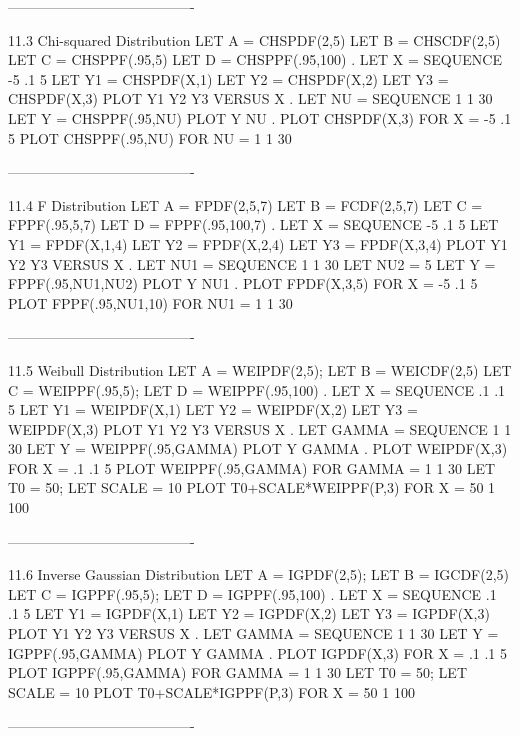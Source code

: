 ----------------------------------------
 
11.3
Chi-squared Distribution
      LET A = CHSPDF(2,5)
      LET B = CHSCDF(2,5)
      LET C = CHSPPF(.95,5)
      LET D = CHSPPF(.95,100)
      .
      LET X = SEQUENCE -5 .1 5
      LET Y1 = CHSPDF(X,1)
      LET Y2 = CHSPDF(X,2)
      LET Y3 = CHSPDF(X,3)
      PLOT Y1 Y2 Y3 VERSUS X
      .
      LET NU = SEQUENCE 1 1 30
      LET Y = CHSPPF(.95,NU)
      PLOT Y NU
      .
      PLOT CHSPDF(X,3) FOR X = -5 .1 5
      PLOT CHSPPF(.95,NU) FOR NU = 1 1 30
 
----------------------------------------
 
11.4
F Distribution
      LET A = FPDF(2,5,7)
      LET B = FCDF(2,5,7)
      LET C = FPPF(.95,5,7)
      LET D = FPPF(.95,100,7)
      .
      LET X = SEQUENCE -5 .1 5
      LET Y1 = FPDF(X,1,4)
      LET Y2 = FPDF(X,2,4)
      LET Y3 = FPDF(X,3,4)
      PLOT Y1 Y2 Y3 VERSUS X
      .
      LET NU1 = SEQUENCE 1 1 30
      LET NU2 = 5
      LET Y = FPPF(.95,NU1,NU2)
      PLOT Y NU1
      .
      PLOT FPDF(X,3,5) FOR X = -5 .1 5
      PLOT FPPF(.95,NU1,10) FOR NU1 = 1 1 30
 
----------------------------------------
 
11.5
Weibull Distribution
      LET A = WEIPDF(2,5); LET B = WEICDF(2,5)
      LET C = WEIPPF(.95,5); LET D = WEIPPF(.95,100)
      .
      LET X = SEQUENCE .1 .1 5
      LET Y1 = WEIPDF(X,1)
      LET Y2 = WEIPDF(X,2)
      LET Y3 = WEIPDF(X,3)
      PLOT Y1 Y2 Y3 VERSUS X
      .
      LET GAMMA = SEQUENCE 1 1 30
      LET Y = WEIPPF(.95,GAMMA)
      PLOT Y GAMMA
      .
      PLOT WEIPDF(X,3) FOR X = .1 .1 5
      PLOT WEIPPF(.95,GAMMA) FOR GAMMA = 1 1 30
      LET T0 = 50; LET SCALE = 10
      PLOT T0+SCALE*WEIPPF(P,3) FOR X = 50 1 100
 
----------------------------------------
 
11.6
Inverse Gaussian Distribution
      LET A = IGPDF(2,5); LET B = IGCDF(2,5)
      LET C = IGPPF(.95,5); LET D = IGPPF(.95,100)
      .
      LET X = SEQUENCE .1 .1 5
      LET Y1 = IGPDF(X,1)
      LET Y2 = IGPDF(X,2)
      LET Y3 = IGPDF(X,3)
      PLOT Y1 Y2 Y3 VERSUS X
      .
      LET GAMMA = SEQUENCE 1 1 30
      LET Y = IGPPF(.95,GAMMA)
      PLOT Y GAMMA
      .
      PLOT IGPDF(X,3) FOR X = .1 .1 5
      PLOT IGPPF(.95,GAMMA) FOR GAMMA = 1 1 30
      LET T0 = 50; LET SCALE = 10
      PLOT T0+SCALE*IGPPF(P,3) FOR X = 50 1 100
 
----------------------------------------
 
